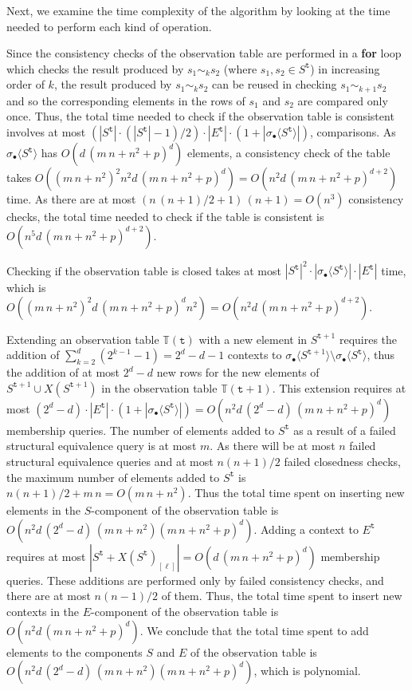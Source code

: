 \documentclass[preprint,12pt,english]{article}
\def\hole{\bullet}
\newcommand\pair[1]{\langle{#1}\rangle}
\def\ty{\mathtt{t}}
\begin{document}
Next, we examine the time complexity of the algorithm by looking at the time needed to perform each kind of operation. 

Since the consistency checks of the observation table are performed in  a {\bf for} loop which checks the result produced by $s_1\sim_k s_2$ (where $s_1,s_2\in S^\ty$) in increasing order of $k$, the result produced by $s_1\sim_k s_2$ can be reused in checking $s_1\sim_{k+1} s_2$ and so the corresponding elements in the rows of $s_1$ and $s_2$ are compared only once. Thus, the total time needed to check if the observation table is consistent involves at most $(|S^\ty|\cdot (|S^\ty|-1)/2)\cdot |E^\ty|\cdot (1+|\sigma_\hole\pair{S^\ty}|)$, comparisons.
As $\sigma_\hole\pair{S^\ty}$ has  $O(d\,(m\,n+n^2+p)^d)$ elements, a consistency check of the  table takes $O((m\,n+n^2)^2 n^2 d\,(m\,n+n^2+p)^d)=O(n^2 d\,(m\,n+n^2+p)^{d+2})$ time.
As there are at most $(n\,(n+1)/2+1)\,(n+1)=O(n^3)$ consistency checks, the total time needed to check if the  table is consistent is $O(n^5 d\,(m\,n+n^2+p)^{d+2}).$

Checking if the observation table is closed takes at most $|S^\ty|^2\cdot |\sigma_\hole\pair{S^\ty}|\cdot |E^\ty|$ time, which is 
$O((m\,n+n^2)^2 d\,(m\,n+n^2+p)^d n^2)=O(n^2d\,(m\,n+n^2+p)^{d+2}).$

Extending an observation table $\mathbb{T}(\ty)$ with a new element in $S^{\ty+1}$ requires the addition of $\sum_{k=2}^d (2^{k-1}-1)=2^d-d-1$ contexts to $\sigma_\hole\pair{S^{\ty+1}}\setminus \sigma_\hole\pair{S^\ty}$, thus the addition of at most $2^d-d$ new rows for the new elements of $S^{\ty+1}\cup X(S^{\ty+1})$ in the observation table $\mathbb{T}(\ty+1).$ This extension requires 
at most
$(2^d-d)\cdot|E^\ty|\cdot(1+|\sigma_\hole\pair{S^\ty}|)=O(n^2d\,(2^d-d)\,(m\,n+n^2+p)^{d})$ membership queries. The number of elements added to $S^\ty$ as a result of a failed structural equivalence query is at most $m.$ As there will be at most $n$ failed structural equivalence queries and at most $n(n+1)/2$ failed closedness checks, the maximum number of elements added to $S^\ty$ is $n(n+1)/2+m\,n=O(m\,n+n^2).$ Thus the total time spent on inserting new elements in the $S$-component of the observation table is $O(n^2d\,(2^d-d)\,(m\,n+n^2)(m\,n+n^2+p)^d)$. 
 Adding a context to $E^\ty$ requires at most $|S^\ty+X(S^\ty)_{[\ell]}|=O(d\,(m\,n+n^2+p)^d)$ membership  queries. These additions are performed only by failed consistency checks, and there are at most $n(n-1)/2$ of them. Thus, the total time spent to insert new contexts in the $E$-component of the observation table is $O(n^2d\,(m\,n+n^2+p)^d).$
We conclude that the total time spent to add elements to the components $S$ and $E$ of the observation table is $O(n^2d\,(2^d-d)\,(m\,n+n^2)(m\,n+n^2+p)^d)$, which is polynomial.
 
\end{document}
